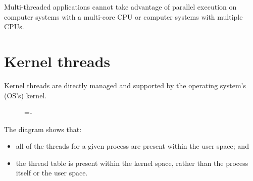 \documentclass[a4paper]{systems-software}
\begin{document}
Multi-threaded applications cannot take advantage of parallel execution on computer systems with a multi-core CPU or computer systems with multiple CPUs.


\newpage

\section*{Kernel threads}

Kernel threads are directly managed and supported by the operating system’s (OS’s) kernel.

\begin{figure}[H]
  \lineskip=-\fboxrule
\end{figure}

The diagram shows that:
\begin{itemize}
	\item all of the threads for a given process are present within the user space; and
	\item the thread table is present within the kernel space, rather than the process itself or the user space.
\end{itemize}
\end{document}
